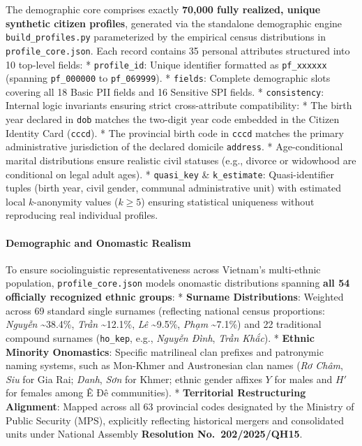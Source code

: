 \documentclass[
]{article}
\begin{document}
The demographic core comprises exactly \textbf{70,000 fully realized,
unique synthetic citizen profiles}, generated via the standalone
demographic engine \texttt{build\_profiles.py} parameterized by the
empirical census distributions in \texttt{profile\_core.json}. Each
record contains 35 personal attributes structured into 10 top-level
fields: * \texttt{profile\_id}: Unique identifier formatted as
\texttt{pf\_xxxxxx} (spanning \texttt{pf\_000000} to
\texttt{pf\_069999}). * \texttt{fields}: Complete demographic slots
covering all 18 Basic PII fields and 16 Sensitive SPI fields. *
\texttt{consistency}: Internal logic invariants ensuring strict
cross-attribute compatibility: * The birth year declared in \texttt{dob}
matches the two-digit year code embedded in the Citizen Identity Card
(\texttt{cccd}). * The provincial birth code in \texttt{cccd} matches
the primary administrative jurisdiction of the declared domicile
\texttt{address}. * Age-conditional marital distributions ensure
realistic civil statuses (e.g., divorce or widowhood are conditional on
legal adult ages). * \texttt{quasi\_key} \& \texttt{k\_estimate}:
Quasi-identifier tuples (birth year, civil gender, communal
administrative unit) with estimated local \(k\)-anonymity values
(\(k \ge 5\)) ensuring statistical uniqueness without reproducing real
individual profiles.

\paragraph{Demographic and Onomastic
Realism}\label{demographic-and-onomastic-realism}

To ensure sociolinguistic representativeness across Vietnam's
multi-ethnic population, \texttt{profile\_core.json} models onomastic
distributions spanning \textbf{all 54 officially recognized ethnic
groups}: * \textbf{Surname Distributions}: Weighted across 69 standard
single surnames (reflecting national census proportions: \emph{Nguyễn}
\textasciitilde38.4\%, \emph{Trần} \textasciitilde12.1\%, \emph{Lê}
\textasciitilde9.5\%, \emph{Phạm} \textasciitilde7.1\%) and 22
traditional compound surnames (\texttt{ho\_kep}, e.g., \emph{Nguyễn
Đình}, \emph{Trần Khắc}). * \textbf{Ethnic Minority Onomastics}:
Specific matrilineal clan prefixes and patronymic naming systems, such
as Mon-Khmer and Austronesian clan names (\emph{Rơ Châm}, \emph{Siu} for
Gia Rai; \emph{Danh}, \emph{Sơn} for Khmer; ethnic gender affixes \(Y\)
for males and \(H'\) for females among Ê Đê communities). *
\textbf{Territorial Restructuring Alignment}: Mapped across all 63
provincial codes designated by the Ministry of Public Security (MPS),
explicitly reflecting historical mergers and consolidated units under
National Assembly \textbf{Resolution No.~202/2025/QH15}.
\end{document}

